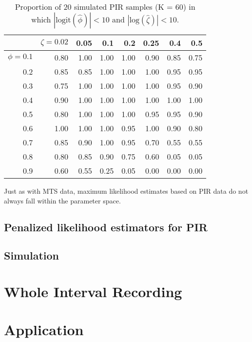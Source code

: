 \documentclass[man, noextraspace, floatsintext]{apa6}\usepackage[]{graphicx}\usepackage[]{color}
\begin{document}
\begin{table}[b]
\centering
\caption{Proportion of 20 simulated PIR samples (K = 60) in which  $|\text{logit}(\hat\phi)| < 10$ and $|\text{log}(\hat\zeta)| < 10$.} 
\label{tab:PIR_ests_valid}
\begin{tabular}{rrrrrrrr}
  \hline
 & $\zeta = 0.02$ & 0.05 & 0.1 & 0.2 & 0.25 & 0.4 & 0.5 \\ 
  \hline
$\phi = 0.1$ & 0.80 & 1.00 & 1.00 & 1.00 & 0.90 & 0.85 & 0.75 \\ 
  0.2 & 0.85 & 0.85 & 1.00 & 1.00 & 1.00 & 0.95 & 0.95 \\ 
  0.3 & 0.75 & 1.00 & 1.00 & 1.00 & 1.00 & 0.95 & 0.90 \\ 
  0.4 & 0.90 & 1.00 & 1.00 & 1.00 & 1.00 & 1.00 & 1.00 \\ 
  0.5 & 0.80 & 1.00 & 1.00 & 1.00 & 0.95 & 0.95 & 0.90 \\ 
  0.6 & 1.00 & 1.00 & 1.00 & 0.95 & 1.00 & 0.90 & 0.80 \\ 
  0.7 & 0.85 & 0.90 & 1.00 & 0.95 & 0.70 & 0.55 & 0.55 \\ 
  0.8 & 0.80 & 0.85 & 0.90 & 0.75 & 0.60 & 0.05 & 0.05 \\ 
  0.9 & 0.60 & 0.55 & 0.25 & 0.05 & 0.00 & 0.00 & 0.00 \\ 
   \hline
\end{tabular}
\end{table}


Just as with MTS data, maximum likelihood estimates based on PIR data do not always fall within the parameter space. 

\subsection{Penalized likelihood estimators for PIR}

\subsection{Simulation}

\section{Whole Interval Recording}
\label{sec:WIR}



\section{Application}
\label{sec:application}
\end{document}
